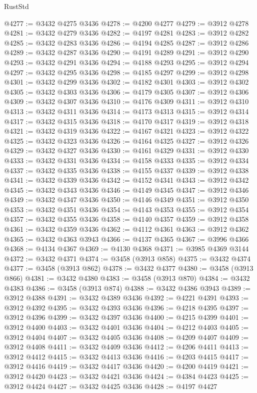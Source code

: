 \begin{lexlean}{RustStd}
\begin{coremodule}
@4277 := @3432 @4275 @3436
@4278 := @4200 @4277
@4279 := @3912 @4278
@4281 := @3432 @4279 @3436
@4282 := @4197 @4281
@4283 := @3912 @4282
@4285 := @3432 @4283 @3436
@4286 := @4194 @4285
@4287 := @3912 @4286
@4289 := @3432 @4287 @3436
@4290 := @4191 @4289
@4291 := @3912 @4290
@4293 := @3432 @4291 @3436
@4294 := @4188 @4293
@4295 := @3912 @4294
@4297 := @3432 @4295 @3436
@4298 := @4185 @4297
@4299 := @3912 @4298
@4301 := @3432 @4299 @3436
@4302 := @4182 @4301
@4303 := @3912 @4302
@4305 := @3432 @4303 @3436
@4306 := @4179 @4305
@4307 := @3912 @4306
@4309 := @3432 @4307 @3436
@4310 := @4176 @4309
@4311 := @3912 @4310
@4313 := @3432 @4311 @3436
@4314 := @4173 @4313
@4315 := @3912 @4314
@4317 := @3432 @4315 @3436
@4318 := @4170 @4317
@4319 := @3912 @4318
@4321 := @3432 @4319 @3436
@4322 := @4167 @4321
@4323 := @3912 @4322
@4325 := @3432 @4323 @3436
@4326 := @4164 @4325
@4327 := @3912 @4326
@4329 := @3432 @4327 @3436
@4330 := @4161 @4329
@4331 := @3912 @4330
@4333 := @3432 @4331 @3436
@4334 := @4158 @4333
@4335 := @3912 @4334
@4337 := @3432 @4335 @3436
@4338 := @4155 @4337
@4339 := @3912 @4338
@4341 := @3432 @4339 @3436
@4342 := @4152 @4341
@4343 := @3912 @4342
@4345 := @3432 @4343 @3436
@4346 := @4149 @4345
@4347 := @3912 @4346
@4349 := @3432 @4347 @3436
@4350 := @4146 @4349
@4351 := @3912 @4350
@4353 := @3432 @4351 @3436
@4354 := @4143 @4353
@4355 := @3912 @4354
@4357 := @3432 @4355 @3436
@4358 := @4140 @4357
@4359 := @3912 @4358
@4361 := @3432 @4359 @3436
@4362 := @4112 @4361
@4363 := @3912 @4362
@4365 := @3432 @4363 @3943
@4366 := @4137 @4365
@4367 := @3996 @4366
@4368 := @4134 @4367
@4369 := @4130 @4368
@4371 := @3985 @4369 @3144
@4372 := @3432 @4371
@4374 := @3458 (@3913 @858)
@4375 := @3432 @4374
@4377 := @3458 (@3913 @862)
@4378 := @3432 @4377
@4380 := @3458 (@3913 @866)
@4381 := @3432 @4380
@4383 := @3458 (@3913 @870)
@4384 := @3432 @4383
@4386 := @3458 (@3913 @874)
@4388 := @3432 @4386 @3943
@4389 := @3912 @4388
@4391 := @3432 @4389 @3436
@4392 := @4221 @4391
@4393 := @3912 @4392
@4395 := @3432 @4393 @3436
@4396 := @4218 @4395
@4397 := @3912 @4396
@4399 := @3432 @4397 @3436
@4400 := @4215 @4399
@4401 := @3912 @4400
@4403 := @3432 @4401 @3436
@4404 := @4212 @4403
@4405 := @3912 @4404
@4407 := @3432 @4405 @3436
@4408 := @4209 @4407
@4409 := @3912 @4408
@4411 := @3432 @4409 @3436
@4412 := @4206 @4411
@4413 := @3912 @4412
@4415 := @3432 @4413 @3436
@4416 := @4203 @4415
@4417 := @3912 @4416
@4419 := @3432 @4417 @3436
@4420 := @4200 @4419
@4421 := @3912 @4420
@4423 := @3432 @4421 @3436
@4424 := @4384 @4423
@4425 := @3912 @4424
@4427 := @3432 @4425 @3436
@4428 := @4197 @4427

\end{coremodule}
\end{lexlean}
